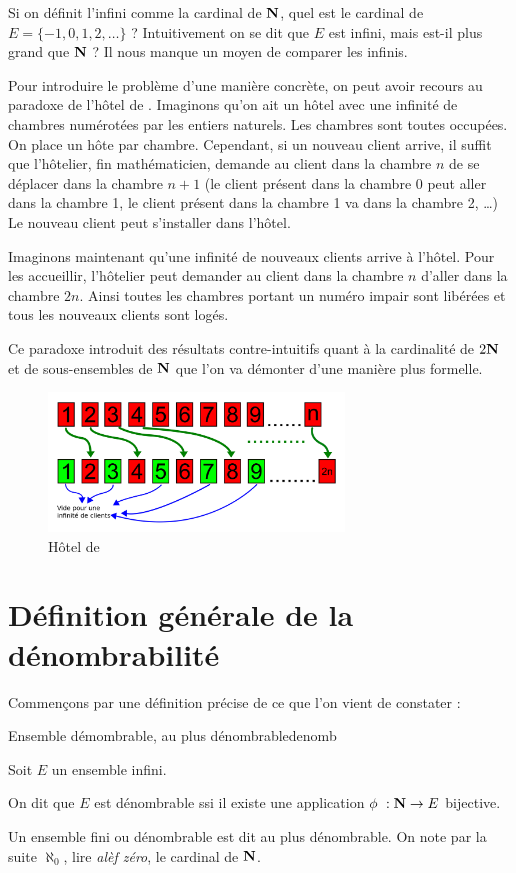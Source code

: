 \documentclass[a4paper,french,final]{memoir}
\begin{document}
Si on définit l'infini comme la cardinal de $\mathbf{N}$, quel est le cardinal de $E= \{-1, 0, 1, 2, \dots\}$ ? Intuitivement on se dit que $E$ est infini, mais est-il plus grand que $\mathbf{N}$ ? Il nous manque un moyen de comparer les infinis.

Pour introduire le problème d'une manière concrète, on peut avoir recours au paradoxe de l'hôtel de . Imaginons qu'on ait un hôtel avec une infinité de chambres numérotées par les entiers naturels. Les chambres sont toutes occupées. On place un hôte par chambre. Cependant, si un nouveau client arrive, il suffit que l'hôtelier, fin mathématicien, demande au client dans la chambre $n$ de se déplacer dans la chambre $n+1$ (le client présent dans la chambre 0 peut aller dans la chambre 1, le client présent dans la chambre 1 va dans la chambre 2, \dots) Le nouveau client peut s'installer dans l'hôtel.

Imaginons maintenant qu'une infinité de nouveaux clients arrive à l'hôtel. Pour les accueillir, l'hôtelier peut demander au client dans la chambre $n$ d'aller dans la chambre $2n$. Ainsi toutes les chambres portant un numéro impair sont libérées et tous les nouveaux clients sont logés.

Ce paradoxe introduit des résultats contre-intuitifs quant à la cardinalité de $2 \mathbf{N}$ et de sous-ensembles de $\mathbf{N}$ que l'on va démonter d'une manière plus formelle.

\begin{figure}[htb]
    \centering
    \includegraphics[width=0.7\textwidth,keepaspectratio]{hotel de hilbert.png}
    \caption{Hôtel de }
    \label{fig:hotel_hilbert}
\end{figure}
\clearpage
\section{Définition générale de la dénombrabilité}
Commençons par une définition précise de ce que l'on vient de constater :
\begin{defb}{Ensemble démombrable, au plus dénombrable}{denomb}

	 Soit $E$ un ensemble infini. 
	 
	 On dit que $E$ est dénombrable ssi il existe une application $\phi~: \NN \to E $ bijective. 
	 
	 Un ensemble fini ou dénombrable est dit au plus dénombrable. \newline
	 On note par la suite $\aleph_0$, lire \emph{alèf zéro}\footnotemark, le cardinal de $\mathbf{N}$. 
\end{defb}
\end{document}
